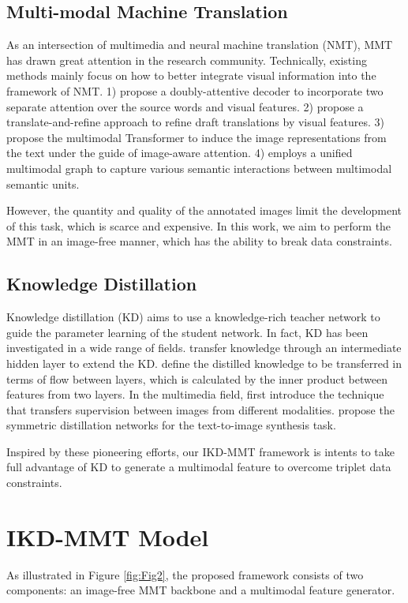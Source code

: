 \documentclass[11pt]{article}
\begin{document}
\subsection{Multi-modal Machine Translation}
As an intersection of multimedia and neural machine translation (NMT), MMT has drawn great attention in the research community.
Technically, existing methods mainly focus on how to better integrate visual information into the framework of NMT.
1) \citet{calixto-etal-2017-doubly} propose a doubly-attentive decoder to incorporate two separate attention over the source words and visual features.
2) \citet{ive-etal-2019-distilling} propose a translate-and-refine approach to refine draft translations by visual features.
3) \citet{yao-wan-2020-multimodal} propose the multimodal Transformer to induce the image representations from the text under the guide of image-aware attention.
4) \citet{yin-etal-2020-novel} employs a unified multimodal graph to capture various semantic interactions between multimodal semantic units.

However, the quantity and quality of the annotated images limit the development of this task, which is scarce and expensive.
In this work, we aim to perform the MMT in an image-free manner, which has the ability to break data constraints.

\subsection{Knowledge Distillation}
Knowledge distillation (KD) \cite{BucilucoModel2006,hinton2015distilling} aims to use a knowledge-rich teacher network to guide the parameter learning of the student network.
In fact, KD has been investigated in a wide range of fields.
\citet{romero2014fitnets} transfer knowledge through an intermediate hidden layer to extend the KD.
\citet{yim2017gift} define the distilled knowledge to be transferred in terms of flow between layers, which is calculated by the inner product between features from two layers.
In the multimedia field, \citet{gupta2016cross} first introduce the technique that transfers supervision between images from different modalities.
\citet{yuan2018text} propose the symmetric distillation networks for the text-to-image synthesis task.


Inspired by these pioneering efforts, our IKD-MMT framework is intents to take full advantage of KD to generate a multimodal feature to overcome triplet data constraints.

\section{IKD-MMT Model}
As illustrated in Figure \ref{fig:Fig2}, the proposed framework consists of two components:
an image-free MMT backbone and a multimodal feature generator.
\end{document}
